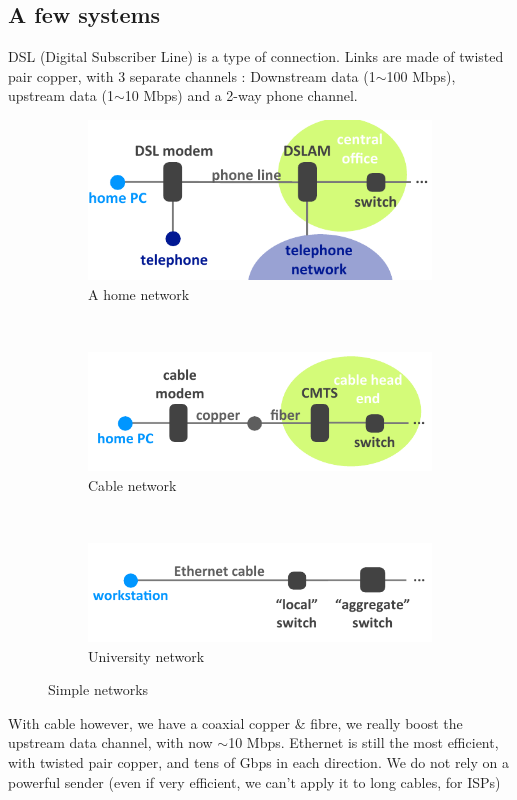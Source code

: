 \documentclass[12pt,a4paper]{article}
\begin{document}
\subsection{A few systems}
DSL (Digital Subscriber Line) is a type of connection. Links are made of twisted pair copper, with 3 separate channels : Downstream data (1$\sim$100 Mbps), upstream data (1$\sim$10 Mbps) and a 2-way phone channel.
\begin{figure}[!h]
	\centering
	\begin{subfigure}[b]{0.33\textwidth}
		\includegraphics[scale=0.45]{images/dsl}
		\caption{A home network}		
		\label{fig: home DSL}
	\end{subfigure}
	~
	\begin{subfigure}[b]{0.33\textwidth}
		\includegraphics[scale=0.45]{images/cable}
		\caption{Cable network}		
		\label{fig: cable}
	\end{subfigure}
	~
	\begin{subfigure}[b]{0.33\textwidth}
		\includegraphics[scale=0.45]{images/uniNet}
		\caption{University network}		
		\label{fig: university network}
	\end{subfigure}
	\caption{Simple networks}
	\label{fig: simple networks}
\end{figure}
With cable however, we have a coaxial copper \& fibre, we really boost the upstream data channel, with now $\sim$10 Mbps. Ethernet is still the most efficient, with twisted pair copper, and tens of Gbps in each direction. We do not rely on a powerful sender (even if very efficient, we can't apply it to long cables, for ISPs)
\end{document}
